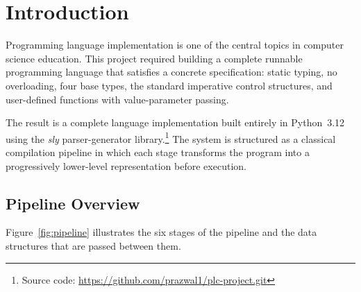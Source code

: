 \documentclass[12pt,a4paper]{report}
\begin{document}
\clearpage
{}
\tableofcontents

\clearpage
\listoffigures

\clearpage
\listoftables

\clearpage
{}

\chapter{Introduction}

Programming language implementation is one of the central topics in computer
science education. This project required building a complete runnable
programming language that satisfies a concrete specification: static typing,
no overloading, four base types, the standard imperative control structures,
and user-defined functions with value-parameter passing.

The result is a complete language implementation built entirely in Python~3.12
using the \textit{sly} parser-generator library.\footnote{Source code: \url{https://github.com/prazwal1/plc-project.git}} The system is structured as a
classical compilation pipeline in which each stage transforms the program into
a progressively lower-level representation before execution.

\section{Pipeline Overview}

Figure~\ref{fig:pipeline} illustrates the six stages of the pipeline and the
data structures that are passed between them.
\end{document}

